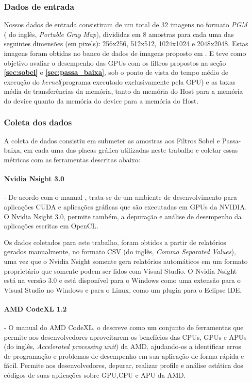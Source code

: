 \subsubsection{Dados de entrada}
Nossos dados de entrada consistiram de um total de 32 imagens no formato \textit{PGM} ( do inglês, \textit{Portable Gray Map}), divididas em 8 amostras para cada uma das seguintes dimensões (em pixels): 256x256, 512x512, 1024x1024 e 2048x2048. Estas imagens foram obtidas no banco de dados de imagens proposto em \cite{MartinFTM01}. E teve como objetivo avaliar o desempenho das GPUs com os filtros propostos na seção \textbf{\ref{sec:sobel}} e \textbf{\ref{sec:passa_baixa}}, sob o ponto de vista do tempo médio de execução do \textit{kernel}(programa executado exclusivamente pela GPU) e as taxas média de transferências da memória, tanto da memória do Host para a memória do device quanto da memória do device para a memória do Host.
\subsubsection{Coleta dos dados}
\label{coleta}
A coleta de dados consistiu em submeter as amostras aos Filtros Sobel e Passa-baixa, em cada uma das placas gráfica utilizadas neste trabalho e coletar essas métricas com as ferramentas descritas abaixo:
\paragraph{Nvidia Nsight 3.0} -  De acordo com o manual \cite{NvidiaNsight}, trata-se de um ambiente de desenvolvimento para aplicações CUDA e aplicações gráficas que são executadas em GPUs da NVIDIA. O Nvidia Nsight 3.0, permite também, a depuração e análise de desempenho da aplicações escritas em OpenCL.

Os dados coletados para este trabalho, foram obtidos a partir de relatórios gerados manualmente, no formato CSV (do inglês, \textit{Comma Separated Values}), uma vez que o Nvidia Nsight somente gera relatórios automáticos em um formato proprietário que somente podem ser lidos com Visual Studio. O Nvidia Nsight está na versão 3.0 e está disponível para o Windows como uma extensão para o Visual Studio no Windows e para o Linux, como um plugin para o Eclipse IDE.

\paragraph{AMD CodeXL 1.2} - O manual do AMD CodeXL, o descreve como um conjunto de ferramentas que permite aos desenvolvedores aproveitarem os benefícios das CPUs, GPUs e APUs (do inglês, \textit{Accelerated processing unit}) da AMD, ajudando-os a identificar erros de programação e problemas de desempenho em sua aplicação de forma rápida e fácil. Permite aos desenvolvedores, depurar, realizar profile e análise estática dos códigos de suas aplicações sobre GPU,CPU e APU da AMD.

